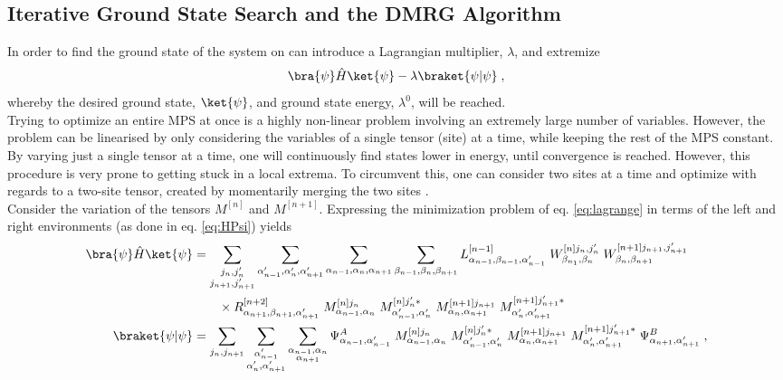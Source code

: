 \subsection{Iterative Ground State Search and the DMRG Algorithm} \label{sec:DMRG}
In order to find the ground state of the system on can introduce a Lagrangian multiplier, $\lambda$, and extremize
\begin{equation}
	\bra{\psi} \hat{H} \ket{\psi} - \lambda \braket{\psi | \psi} \; ,
	\label{eq:lagrange}
\end{equation}
whereby the desired ground state, $\ket{\psi}$, and ground state energy, $\lambda^0$, will be reached.\\
Trying to optimize an entire MPS at once is a highly non-linear problem involving an extremely large number of variables. However, the problem can be linearised by only considering the variables of a single tensor (site) at a time, while keeping the rest of the MPS constant. By varying just a single tensor at a time, one will continuously find states lower in energy, until convergence is reached. However, this procedure is very prone to getting stuck in a local extrema. To circumvent this, one can consider two sites at a time and optimize with regards to a two-site tensor, created by momentarily merging the two sites \cite{White1993}.\\
Consider the variation of the tensors $M^{[n]}$ and $M^{[n+1]}$. Expressing the minimization problem of eq. \eqref{eq:lagrange} in terms of the left and right environments (as done in eq. \eqref{eq:HPsi}) yields
\begin{align}
	\bra{\psi} \hat{H} \ket{\psi} &= \sum_{\substack{j_n , j_n ' \\ j_{n+1} , j_{n+1} '}} \sum_{\alpha_{n-1} ' , \alpha_n ', \alpha_{n+1} '} \sum_{\alpha_{n-1} , \alpha_n , \alpha_{n+1}} \sum_{\beta_{n-1} , \beta_n , \beta_{n+1}} L_{\alpha_{n-1}, \beta_{n-1} , \alpha_{n-1} '}^{[n-1]} \; W_{\beta_{n_1}, \beta_n}^{[n] j_n , j_n '} \; W_{\beta_{n}, \beta_{n+1}}^{[n+1] j_{n+1} , j_{n+1} '} \nonumber \\
	& \qquad \times R_{\alpha_{n+1} ,\beta_{n+1} , \alpha_{n+1} '}^{[n+2]} \; M_{\alpha_{n-1} , \alpha_{n}}^{[n] j_n } \; M_{\alpha_{n-1} ' , \alpha_{n} '}^{[n] j_n ' *} \; M_{\alpha_{n} , \alpha_{n+1}}^{[n+1] j_{n+1} } \; M_{\alpha_{n} ' , \alpha_{n+1} '}^{[n+1] j_{n+1} ' *}  \label{eq:twositeHamil}\\
	\braket{\psi | \psi} &= \sum_{j_n , j_{n+1} } \sum_{\substack{\alpha_{n-1} ' \\ \alpha_n ', \alpha_{n+1} '}} \sum_{\substack{\alpha_{n-1} , \alpha_n \\ \alpha_{n+1}}} \Psi_{\alpha_{n-1},\alpha_{n-1}'}^{A} \; M_{\alpha_{n-1} , \alpha_{n}}^{[n] j_n } \; M_{\alpha_{n-1} ' , \alpha_{n} '}^{[n] j_n ' *} \; M_{\alpha_{n} , \alpha_{n+1}}^{[n+1] j_{n+1} } \; M_{\alpha_{n} ' , \alpha_{n+1} '}^{[n+1] j_{n+1} ' *} \; \Psi_{\alpha_{n+1},\alpha_{n+1}'}^{B} \; , \label{eq:twositeOverlap}
\end{align}
